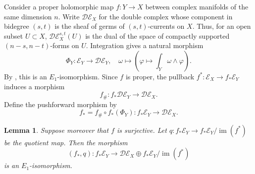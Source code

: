 \documentclass[11pt]{amsart}
\numberwithin{equation}{section}
\theoremstyle{plain}
\newtheorem{Le}[thm]{Lemma}
\theoremstyle{definition}
\begin{document}
Consider a proper holomorphic map $f:Y\longrightarrow X$ between complex
manifolds of the same dimension $n$.  Write $\mathcal D\mathcal E_X$ for
the double complex whose component in bidegree $(s,t)$ is the sheaf of germs
of $(s,t)$-currents on $X$.  Thus, for an open subset $U\subset X$,
$\mathcal D\mathcal E_X^{s,t}(U)$ is the dual of the space of compactly
supported $(n-s,n-t)$-forms on $U$.  Integration gives a natural morphism
\[ \Phi_Y: \mathcal E_Y \longrightarrow \mathcal{D}\mathcal E_Y, \quad
\omega \longmapsto \left( \varphi \mapsto \int_Y \omega \wedge \varphi \right).\]
By \cite[Theorem~1]{Serre}, this is an $E_1$-isomorphism.  Since $f$ is proper, the
pullback $f^*:\mathcal E_X\longrightarrow f_*\mathcal E_Y$ induces a
morphism
\[f_\#: f_*\mathcal{D}\mathcal E_Y
\longrightarrow \mathcal{D}\mathcal E_X.\]
Define the pushforward morphism by
\[f_*=f_\#\circ f_*(\Phi_Y):f_*\mathcal E_Y
\longrightarrow\mathcal D\mathcal E_X.\]
\begin{Le}\label{prop-smooth-pushforward}
Suppose moreover that $f$ is surjective.  Let
$q:f_*\mathcal E_Y\longrightarrow
f_*\mathcal E_Y/\operatorname{im}(f^*)$
be the quotient map.  Then the morphism
\[(f_*, q):
f_*\mathcal E_Y \longrightarrow \mathcal{D}\mathcal E_X \oplus f_*\mathcal E_Y / \operatorname{im}(f^{*})
\]
 is an $E_1$-isomorphism.
\end{Le}
\end{document}
